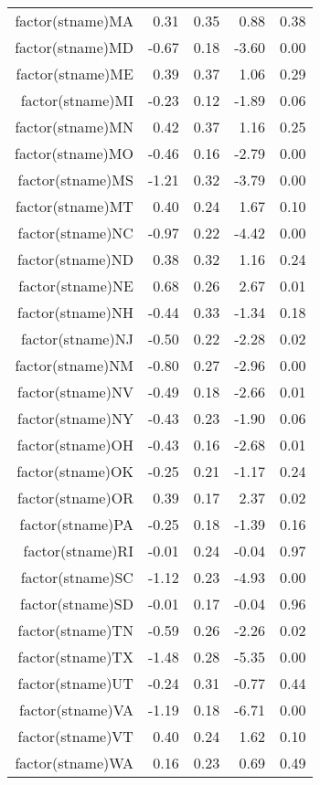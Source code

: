 \begin{table}[ht]
\begin{tabular}{rrrrr}
  factor(stname)MA & 0.31 & 0.35 & 0.88 & 0.38 \\ 
  factor(stname)MD & -0.67 & 0.18 & -3.60 & 0.00 \\ 
  factor(stname)ME & 0.39 & 0.37 & 1.06 & 0.29 \\ 
  factor(stname)MI & -0.23 & 0.12 & -1.89 & 0.06 \\ 
  factor(stname)MN & 0.42 & 0.37 & 1.16 & 0.25 \\ 
  factor(stname)MO & -0.46 & 0.16 & -2.79 & 0.00 \\ 
  factor(stname)MS & -1.21 & 0.32 & -3.79 & 0.00 \\ 
  factor(stname)MT & 0.40 & 0.24 & 1.67 & 0.10 \\ 
  factor(stname)NC & -0.97 & 0.22 & -4.42 & 0.00 \\ 
  factor(stname)ND & 0.38 & 0.32 & 1.16 & 0.24 \\ 
  factor(stname)NE & 0.68 & 0.26 & 2.67 & 0.01 \\ 
  factor(stname)NH & -0.44 & 0.33 & -1.34 & 0.18 \\ 
  factor(stname)NJ & -0.50 & 0.22 & -2.28 & 0.02 \\ 
  factor(stname)NM & -0.80 & 0.27 & -2.96 & 0.00 \\ 
  factor(stname)NV & -0.49 & 0.18 & -2.66 & 0.01 \\ 
  factor(stname)NY & -0.43 & 0.23 & -1.90 & 0.06 \\ 
  factor(stname)OH & -0.43 & 0.16 & -2.68 & 0.01 \\ 
  factor(stname)OK & -0.25 & 0.21 & -1.17 & 0.24 \\ 
  factor(stname)OR & 0.39 & 0.17 & 2.37 & 0.02 \\ 
  factor(stname)PA & -0.25 & 0.18 & -1.39 & 0.16 \\ 
  factor(stname)RI & -0.01 & 0.24 & -0.04 & 0.97 \\ 
  factor(stname)SC & -1.12 & 0.23 & -4.93 & 0.00 \\ 
  factor(stname)SD & -0.01 & 0.17 & -0.04 & 0.96 \\ 
  factor(stname)TN & -0.59 & 0.26 & -2.26 & 0.02 \\ 
  factor(stname)TX & -1.48 & 0.28 & -5.35 & 0.00 \\ 
  factor(stname)UT & -0.24 & 0.31 & -0.77 & 0.44 \\ 
  factor(stname)VA & -1.19 & 0.18 & -6.71 & 0.00 \\ 
  factor(stname)VT & 0.40 & 0.24 & 1.62 & 0.10 \\ 
  factor(stname)WA & 0.16 & 0.23 & 0.69 & 0.49 \\ 

\end{tabular}
\end{table}
